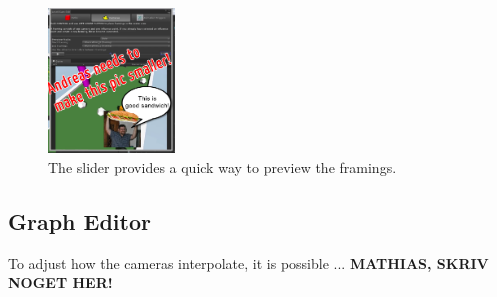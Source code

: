 

\begin{figure}[htbp]
\centering
\includegraphics[width=0.3\textwidth]{Pics/slider}
\caption{The slider provides a quick way to preview the framings.}
\label{fig:slider}
\end{figure}

\subsection{Graph Editor}
To adjust how the cameras interpolate, it is possible ...
\textbf{MATHIAS, SKRIV NOGET HER!}

